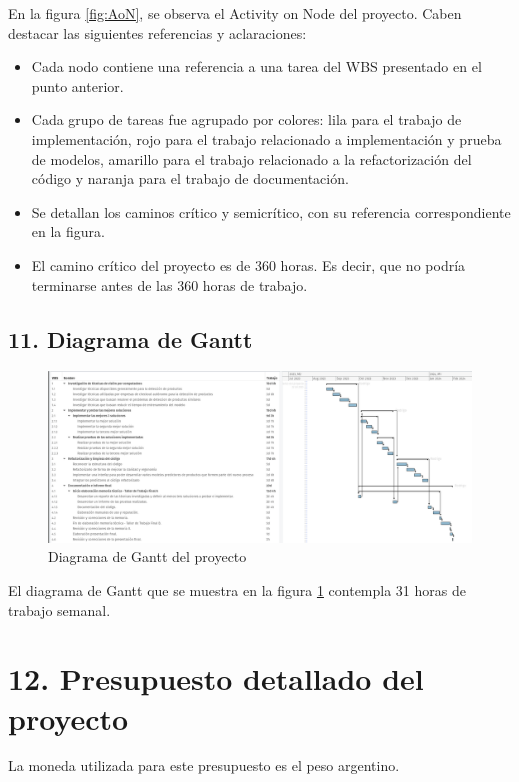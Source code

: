 \documentclass[
11pt, %
]{charter}
\begin{document}
En la figura \ref{fig:AoN}, se observa el Activity on Node del proyecto. Caben destacar las siguientes referencias y aclaraciones:
\begin{itemize}
\item Cada nodo contiene una referencia a una tarea del WBS presentado en el punto anterior.
\item Cada grupo de tareas fue agrupado por colores: lila para el trabajo de implementación, rojo para el trabajo relacionado a implementación y prueba de modelos, amarillo para el trabajo relacionado a la refactorización del código y naranja para el trabajo de documentación.
\item Se detallan los caminos crítico y semicrítico, con su referencia correspondiente en la figura.
\item El camino crítico del proyecto es de 360 horas. Es decir, que no podría terminarse antes de las 360 horas de trabajo.
\end{itemize}

\begin{landscape}
\section{11. Diagrama de Gantt}
\label{sec:gantt}
\begin{figure}[htpb]
\centering 
\includegraphics[height=.63\textheight]{./gantt full.png}
\caption{Diagrama de Gantt del proyecto}
\label{fig:diagGantt}
\end{figure}
El diagrama de Gantt que se muestra en la figura \ref{fig:diagGantt} contempla 31 horas de trabajo semanal.
\end{landscape}

\section{12. Presupuesto detallado del proyecto}
\label{sec:presupuesto}

La moneda utilizada para este presupuesto es el peso argentino.
\end{document}
